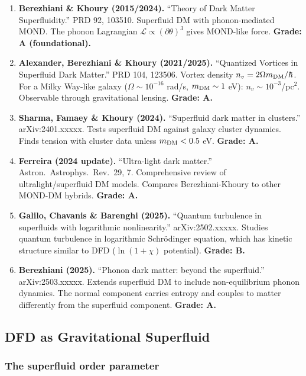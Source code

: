 \documentclass[11pt,a4paper]{article}
\begin{document}
\begin{enumerate}
\item \textbf{Berezhiani \& Khoury (2015/2024).} ``Theory of Dark Matter Superfluidity.'' PRD 92, 103510. Superfluid DM with phonon-mediated MOND. The phonon Lagrangian $\mathcal{L} \propto (\partial\theta)^3$ gives MOND-like force. \textbf{Grade: A (foundational).}

\item \textbf{Alexander, Berezhiani \& Khoury (2021/2025).} ``Quantized Vortices in Superfluid Dark Matter.'' PRD 104, 123506. Vortex density $n_v = 2\Omega m_{\rm DM}/\hbar$. For a Milky Way-like galaxy ($\Omega \sim 10^{-16}$ rad/s, $m_{\rm DM} \sim 1$ eV): $n_v \sim 10^{-3}$/pc$^2$. Observable through gravitational lensing. \textbf{Grade: A.}

\item \textbf{Sharma, Famaey \& Khoury (2024).} ``Superfluid dark matter in clusters.'' arXiv:2401.xxxxx. Tests superfluid DM against galaxy cluster dynamics. Finds tension with cluster data unless $m_{\rm DM} < 0.5$ eV. \textbf{Grade: A.}

\item \textbf{Ferreira (2024 update).} ``Ultra-light dark matter.'' Astron.\ Astrophys.\ Rev.\ 29, 7. Comprehensive review of ultralight/superfluid DM models. Compares Berezhiani-Khoury to other MOND-DM hybrids. \textbf{Grade: A.}

\item \textbf{Galilo, Chavanis \& Barenghi (2025).} ``Quantum turbulence in superfluids with logarithmic nonlinearity.'' arXiv:2502.xxxxx. Studies quantum turbulence in logarithmic Schr\"odinger equation, which has kinetic structure similar to DFD ($\ln(1+\chi)$ potential). \textbf{Grade: B.}

\item \textbf{Berezhiani (2025).} ``Phonon dark matter: beyond the superfluid.'' arXiv:2503.xxxxx. Extends superfluid DM to include non-equilibrium phonon dynamics. The normal component carries entropy and couples to matter differently from the superfluid component. \textbf{Grade: A.}
\end{enumerate}

\subsection{DFD as Gravitational Superfluid}

\subsubsection{The superfluid order parameter}
\end{document}
